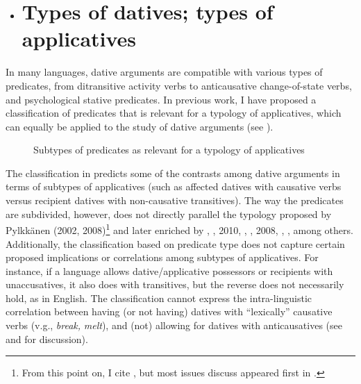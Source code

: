 \documentclass[output=paper,modfonts,nonflat]{langsci/langscibook}
\begin{document}
\begin{itemize}
\item \section{Types of datives; types of applicatives}
\end{itemize}

In many languages, dative arguments are compatible with various types of predicates, from ditransitive activity verbs to anticausative change-of-state verbs, and psychological stative predicates. In previous work, I have proposed a classification of predicates that is relevant for a typology of applicatives, which can equally be applied to the study of dative arguments (see ).

 
\begin{figure}
\caption{Subtypes of predicates as relevant for a typology of applicatives \citep[130]{Cuervo2015a}}
\label{fig:key:1}
\end{figure}

The classification in  predicts some of the contrasts among dative arguments in terms of subtypes of applicatives (such as affected datives with causative verbs versus recipient datives with non-causative transitives). The way the predicates are subdivided, however, does not directly parallel the typology proposed by Pylkkänen (2002, 2008)\footnote{From this point on, I cite \citealt{Pylkkänen2008}, but most issues discuss appeared first in \citealt{Pylkkänen2002}.}  and later enriched by \citealt{BonehNash2011}, \citealt{Cuervo2003}, 2010, \citealt{Kim2011}, \citealt{McGinnis2001}, 2008, \citealt{McGinnisGerdts2004}, \citealt{RobergeTroberg2009}, among others. Additionally, the classification based on predicate type does not capture certain proposed implications or correlations among subtypes of applicatives. For instance, if a language allows dative/applicative possessors or recipients with unaccusatives, it also does with transitives, but the reverse does not necessarily hold, as in English. The classification cannot express the intra-linguistic correlation between having (or not having) datives with “lexically” causative verbs (v.g., \textit{break,} \textit{melt}), and (not) allowing for datives with anticausatives (see \citealt{Peterson2007} and \citealt{Cuervo2015a} for discussion). 
\end{document}

